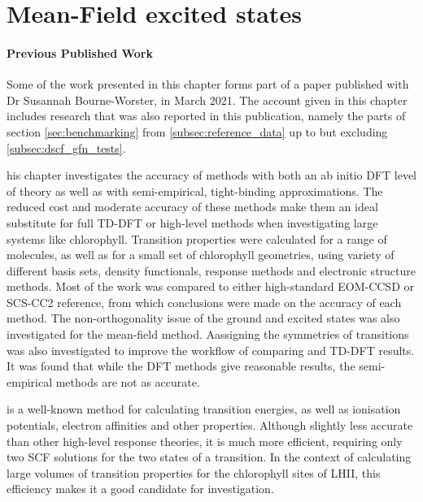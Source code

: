 %
%
\chapter{Mean-Field excited states}
\label{chap:dscf}

\subsubsection*{Previous Published Work}
Some of the work presented in this chapter forms part of a paper published with 
Dr Susannah Bourne-Worster, in March 2021\cite{Worster2021}. The account given in this 
chapter includes research that was also reported in this publication, namely the
parts of section \ref{sec:benchmarking} from \ref{subsec:reference_data} up to
but excluding \ref{subsec:dscf_gfn_tests}.

his chapter investigates the accuracy of \dscf methods with  both an 
ab initio DFT level of theory as well as with semi-empirical, tight-binding
approximations. The reduced cost and moderate accuracy of these methods
make them an ideal substitute for full TD-DFT or high-level methods when investigating
large systems like chlorophyll.
Transition properties were calculated for a range of molecules, as well as
for a small set of chlorophyll geometries, using variety of different basis sets,
density functionals, response methods and electronic structure methods. Most of 
the work was compared to either high-standard EOM-CCSD or SCS-CC2 reference, from
which conclusions were made on the accuracy of each method. The non-orthogonality 
issue of the ground and excited states was also investigated for the mean-field 
\dscf method. 
Aassigning the symmetries of transitions was also investigated to improve the workflow
of comparing \dscf and TD-DFT results.
It was found that while the DFT methods give reasonable results, the semi-empirical
\dscf methods are not as accurate.

\dscf is a well-known method for calculating transition energies, as well as
ionisation potentials, electron affinities and other properties. Although slightly
less accurate than other high-level response theories, it is much more efficient,
requiring only two SCF solutions for the two states of a transition. In the context 
of calculating large volumes of transition properties for the chlorophyll sites of
LHII, this efficiency makes it a good candidate for investigation.

